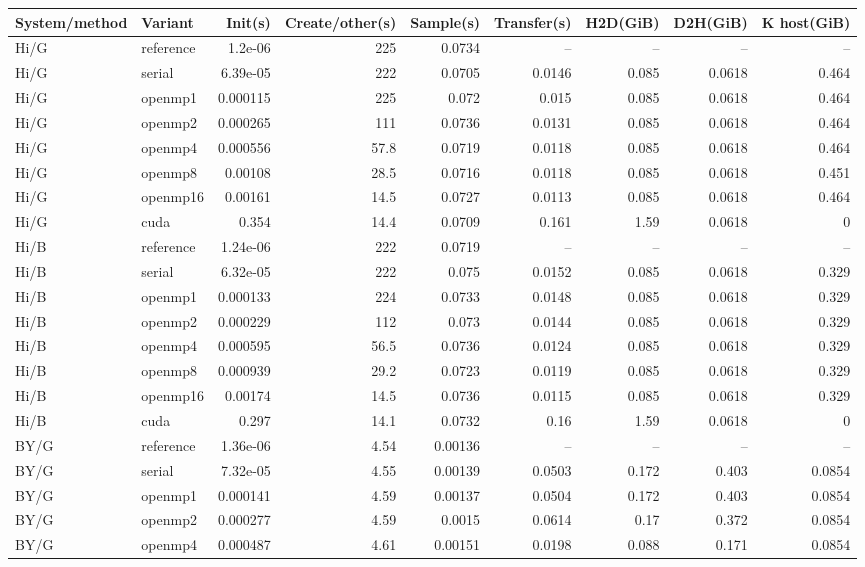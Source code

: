 \documentclass[11pt]{article}
\begin{document}
\scriptsize\begin{longtable}{llrrrrrrr}
\toprule System/method & Variant & Init(s) & Create/other(s) & Sample(s) & Transfer(s) & H2D(GiB) & D2H(GiB) & K host(GiB)\\
\midrule\endhead
Hi/G & reference & 1.2e-06 & 225 & 0.0734 & -- & -- & -- & --\\
Hi/G & serial & 6.39e-05 & 222 & 0.0705 & 0.0146 & 0.085 & 0.0618 & 0.464\\
Hi/G & openmp1 & 0.000115 & 225 & 0.072 & 0.015 & 0.085 & 0.0618 & 0.464\\
Hi/G & openmp2 & 0.000265 & 111 & 0.0736 & 0.0131 & 0.085 & 0.0618 & 0.464\\
Hi/G & openmp4 & 0.000556 & 57.8 & 0.0719 & 0.0118 & 0.085 & 0.0618 & 0.464\\
Hi/G & openmp8 & 0.00108 & 28.5 & 0.0716 & 0.0118 & 0.085 & 0.0618 & 0.451\\
Hi/G & openmp16 & 0.00161 & 14.5 & 0.0727 & 0.0113 & 0.085 & 0.0618 & 0.464\\
Hi/G & cuda & 0.354 & 14.4 & 0.0709 & 0.161 & 1.59 & 0.0618 & 0\\
Hi/B & reference & 1.24e-06 & 222 & 0.0719 & -- & -- & -- & --\\
Hi/B & serial & 6.32e-05 & 222 & 0.075 & 0.0152 & 0.085 & 0.0618 & 0.329\\
Hi/B & openmp1 & 0.000133 & 224 & 0.0733 & 0.0148 & 0.085 & 0.0618 & 0.329\\
Hi/B & openmp2 & 0.000229 & 112 & 0.073 & 0.0144 & 0.085 & 0.0618 & 0.329\\
Hi/B & openmp4 & 0.000595 & 56.5 & 0.0736 & 0.0124 & 0.085 & 0.0618 & 0.329\\
Hi/B & openmp8 & 0.000939 & 29.2 & 0.0723 & 0.0119 & 0.085 & 0.0618 & 0.329\\
Hi/B & openmp16 & 0.00174 & 14.5 & 0.0736 & 0.0115 & 0.085 & 0.0618 & 0.329\\
Hi/B & cuda & 0.297 & 14.1 & 0.0732 & 0.16 & 1.59 & 0.0618 & 0\\
BY/G & reference & 1.36e-06 & 4.54 & 0.00136 & -- & -- & -- & --\\
BY/G & serial & 7.32e-05 & 4.55 & 0.00139 & 0.0503 & 0.172 & 0.403 & 0.0854\\
BY/G & openmp1 & 0.000141 & 4.59 & 0.00137 & 0.0504 & 0.172 & 0.403 & 0.0854\\
BY/G & openmp2 & 0.000277 & 4.59 & 0.0015 & 0.0614 & 0.17 & 0.372 & 0.0854\\
BY/G & openmp4 & 0.000487 & 4.61 & 0.00151 & 0.0198 & 0.088 & 0.171 & 0.0854\\

\end{longtable}
\end{document}
